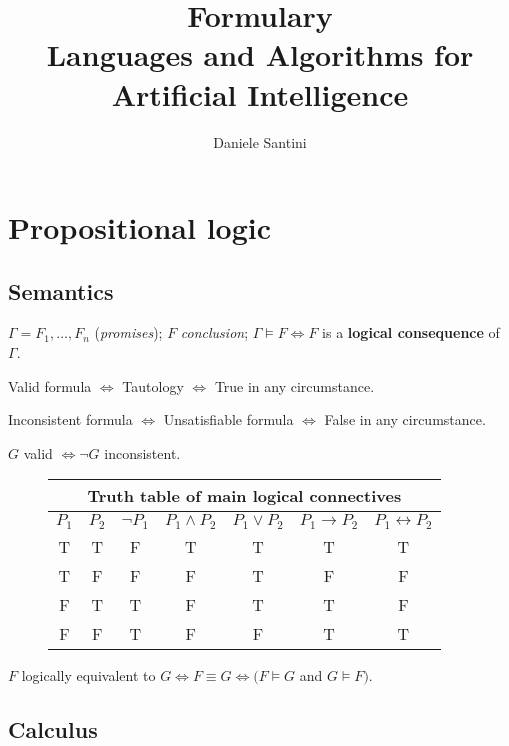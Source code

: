 \documentclass[]{article}
\title{Formulary \\ \large Languages and Algorithms for Artificial Intelligence}
\author{Daniele Santini}
\begin{document}

\section{Propositional logic}

\subsection{Semantics}

\noindent $\Gamma = F_1,\dots,F_n$ (\textit{promises});
$F$ \textit{conclusion}; 	
$\Gamma \vDash F \iff F$ is a \textbf{logical consequence} of $\Gamma$.

\noindent Valid formula $\iff$ Tautology $\iff$ True in any circumstance.

\noindent Inconsistent formula $\iff$ Unsatisfiable formula $\iff$ False in any circumstance.

\noindent $G$ valid $\iff \neg G$ inconsistent.

\begin{figure}[h]
	\centering
	\begin{tabular}{ |c |c|c | c | c| c | c | } 
		\hline
		\multicolumn{7}{|c|}{Truth table of main logical connectives} \\
		\hline
		\textbf{$P_1$} & \textbf{$P_2$} & \textbf{$\neg P_1$} & \textbf{$P_1 \land P_2$} & \textbf{$P_1 \lor P_2$} & \textbf{$P_1 \rightarrow P_2$} & \textbf{$P_1 \leftrightarrow P_2$} \\
		\hline
		T & T & F & T & T & T & T \\
		\hline
		T & F & F & F & T & F & F \\
		\hline
		F & T & T & F & T & T & F \\
		\hline
		F & F & T & F & F & T & T \\
		\hline
	\end{tabular}
\end{figure}

\noindent $F$ logically equivalent to $G \iff F \equiv G \iff (F \vDash G$ and $G \vDash F)$.

\subsection{Calculus}
\end{document}
